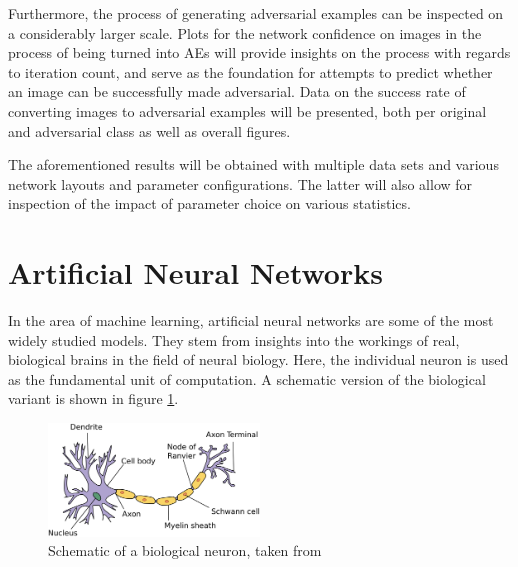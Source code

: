 \documentclass[11pt, a4paper]{article}
\begin{document}
Furthermore, the process of generating adversarial examples can be inspected on a considerably larger scale. Plots for the network confidence on images in the process of being turned into AEs will provide insights on the process with regards to iteration count, and serve as the foundation for attempts to predict whether an image can be successfully made adversarial. Data on the success rate of converting images to adversarial examples will be presented, both per original and adversarial class as well as overall figures.

The aforementioned results will be obtained with multiple data sets and various network layouts and parameter configurations. The latter will also allow for inspection of the impact of parameter choice on various statistics.











\newpage
\section{Artificial Neural Networks}
\label{sec:artificial-neural-networks}
In the area of machine learning, artificial neural networks are some of the most widely studied models. They stem from insights into the workings of real, biological brains in the field of neural biology. Here, the individual neuron is used as the fundamental unit of computation. A schematic version of the biological variant is shown in figure \ref{fig:biological-neuron-schematic}.

\begin{figure}[htp]
	\centering
	\includegraphics[width=0.5\textwidth]{images/biological_neuron.png}
	\caption{Schematic of a biological neuron, taken from \cite{biological-neuron-schematic}}
	\label{fig:biological-neuron-schematic}
\end{figure}
\end{document}
